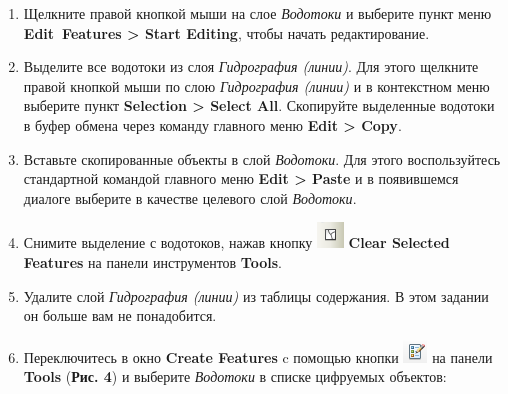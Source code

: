 \documentclass[12pt,]{book}
\begin{document}
\begin{enumerate}
\def\labelenumi{\arabic{enumi}.}
\item
  Щелкните правой кнопкой мыши на слое \emph{Водотоки} и выберите пункт меню \textbf{Edit~Features \textgreater{} Start Editing}, чтобы начать редактирование.
\item
  Выделите все водотоки из слоя \emph{Гидрография (линии)}. Для этого щелкните правой кнопкой мыши по слою \emph{Гидрография (линии)} и в контекстном меню выберите пункт \textbf{Selection \textgreater{} Select All}. Скопируйте выделенные водотоки в буфер обмена через команду главного меню \textbf{Edit \textgreater{} Copy}.
\item
  Вставьте скопированные объекты в слой \emph{Водотоки}. Для этого воспользуйтесь стандартной командой главного меню \textbf{Edit \textgreater{} Paste} и в появившемся диалоге выберите в качестве целевого слой \emph{Водотоки}.
\item
  Снимите выделение с водотоков, нажав кнопку \includegraphics{images/Ex13/image10.png} \textbf{Clear Selected Features} на панели инструментов \textbf{Tools}.
\item
  Удалите слой \emph{Гидрография (линии)} из таблицы содержания. В этом задании он больше вам не понадобится.
\item
  Переключитесь в окно \textbf{Create Features} c помощью кнопки \includegraphics{images/Ex13/image11.png} на панели \textbf{Tools} (\textbf{Рис. 4}) и выберите \emph{Водотоки} в списке цифруемых объектов:


\end{enumerate}
\end{document}
